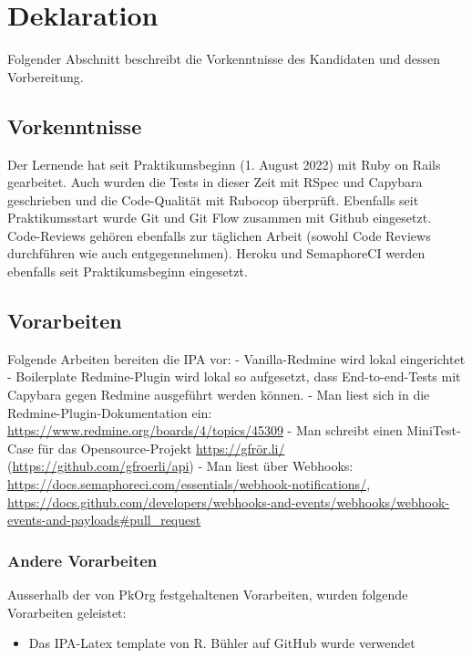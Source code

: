 \chapter{Deklaration}

Folgender Abschnitt beschreibt die Vorkenntnisse des Kandidaten und dessen Vorbereitung.

\section{Vorkenntnisse}

Der Lernende hat seit Praktikumsbeginn (1. August 2022) mit Ruby on Rails gearbeitet. Auch wurden die Tests in dieser Zeit mit RSpec und Capybara geschrieben und die Code-Qualität mit Rubocop überprüft. Ebenfalls seit Praktikumsstart wurde Git und Git Flow zusammen mit Github eingesetzt. Code-Reviews gehören ebenfalls zur täglichen Arbeit (sowohl Code Reviews durchführen wie auch entgegennehmen). Heroku und SemaphoreCI werden ebenfalls seit Praktikumsbeginn eingesetzt.

\section{Vorarbeiten}

Folgende Arbeiten bereiten die IPA vor: \newline
- Vanilla-Redmine wird lokal eingerichtet \newline
- Boilerplate Redmine-Plugin wird lokal so aufgesetzt, dass End-to-end-Tests mit Capybara gegen Redmine ausgeführt werden können. \newline
- Man liest sich in die Redmine-Plugin-Dokumentation ein: \url{https://www.redmine.org/boards/4/topics/45309} \newline
- Man schreibt einen MiniTest-Case für das Opensource-Projekt \url{https://gfrör.li/} (\url{https://github.com/gfroerli/api}) \newline
- Man liest über Webhooks: \url{https://docs.semaphoreci.com/essentials/webhook-notifications/}, \url{https://docs.github.com/developers/webhooks-and-events/webhooks/webhook-events-and-payloads\#pull\_request} \newline

\subsection{Andere Vorarbeiten}
Ausserhalb der von PkOrg festgehaltenen Vorarbeiten, wurden folgende Vorarbeiten geleistet:
\begin{itemize}
    \item Das IPA-Latex template von R. Bühler auf GitHub wurde verwendet \cite{Buhler_ipa-template_2022}
\end{itemize}

